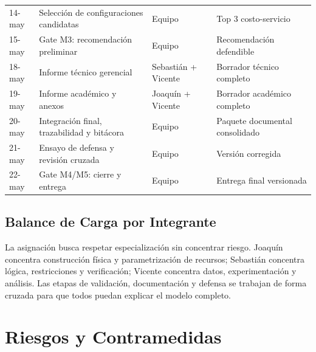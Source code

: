 \documentclass[11pt,letterpaper]{article}
\begin{document}
\begin{longtable}{L{2.4cm}L{4.5cm}L{3.6cm}L{4.3cm}}
  14-may & Selección de configuraciones candidatas & Equipo & Top 3 costo-servicio \\
  15-may & Gate M3: recomendación preliminar & Equipo & Recomendación defendible \\
  18-may & Informe técnico gerencial & Sebastián + Vicente & Borrador técnico completo \\
  19-may & Informe académico y anexos & Joaquín + Vicente & Borrador académico completo \\
  20-may & Integración final, trazabilidad y bitácora & Equipo & Paquete documental consolidado \\
  21-may & Ensayo de defensa y revisión cruzada & Equipo & Versión corregida \\
  22-may & Gate M4/M5: cierre y entrega & Equipo & Entrega final versionada \\
  \bottomrule
\end{longtable}

\subsection{Balance de Carga por Integrante}

La asignación busca respetar especialización sin concentrar riesgo. Joaquín concentra construcción física y parametrización de recursos; Sebastián concentra lógica, restricciones y verificación; Vicente concentra datos, experimentación y análisis. Las etapas de validación, documentación y defensa se trabajan de forma cruzada para que todos puedan explicar el modelo completo.

\section{Riesgos y Contramedidas}
\end{document}
